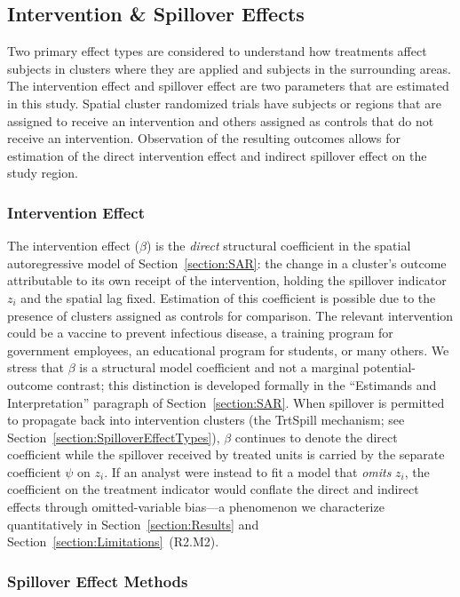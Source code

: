 \documentclass{article}[11pt]
\begin{document}
\subsection{Intervention \& Spillover Effects}

Two primary effect types are considered to understand how treatments affect subjects in clusters where they are applied and subjects in the surrounding areas. The intervention effect and spillover effect are two parameters that are estimated in this study. Spatial cluster randomized trials have subjects or regions that are assigned to receive an intervention and others assigned as controls that do not receive an intervention. Observation of the resulting outcomes allows for estimation of the direct intervention effect and indirect spillover effect on the study region.

\subsubsection{Intervention Effect}\label{Section:InterventionEffect}

The intervention effect ($\beta$) is the \textit{direct} structural coefficient in the spatial autoregressive model of Section~\ref{section:SAR}: the change in a cluster's outcome attributable to its own receipt of the intervention, holding the spillover indicator $z_i$ and the spatial lag fixed. Estimation of this coefficient is possible due to the presence of clusters assigned as controls for comparison. The relevant intervention could be a vaccine to prevent infectious disease, a training program for government employees, an educational program for students, or many others. We stress that $\beta$ is a structural model coefficient and not a marginal potential-outcome contrast; this distinction is developed formally in the ``Estimands and Interpretation'' paragraph of Section~\ref{section:SAR}. When spillover is permitted to propagate back into intervention clusters (the TrtSpill mechanism; see Section~\ref{section:SpilloverEffectTypes}), $\beta$ continues to denote the direct coefficient while the spillover received by treated units is carried by the separate coefficient $\psi$ on $z_i$. If an analyst were instead to fit a model that \emph{omits} $z_i$, the coefficient on the treatment indicator would conflate the direct and indirect effects through omitted-variable bias---a phenomenon we characterize quantitatively in Section~\ref{section:Results} and Section~\ref{section:Limitations}~(R2.M2).

\subsubsection{Spillover Effect Methods}\label{Section:SpilloverEffectMethods}
\end{document}
